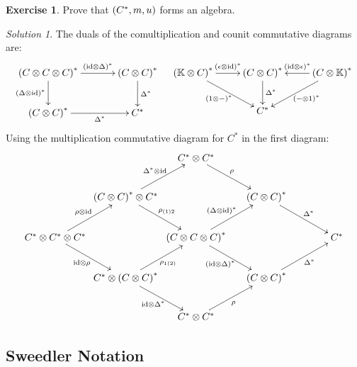 \documentclass[svgnames]{article}
\theoremstyle{definition}
\newtheorem{Exercise}{Exercise}
\theoremstyle{remark}
\newtheorem*{Solution*}{Solution}
\theoremstyle{underline}
\theoremstyle{underline}
\newcommand{\id}{\mathrm{id}}
\begin{document}
 	\begin{Exercise}
 		Prove that $\pqty{C^*, m, u}$ forms an algebra.
 	\end{Exercise}
 	\begin{Solution*}
 		The duals of the comultiplication and counit commutative diagrams are:
 		\begin{align*}
		\xymatrix@!C{
			\pqty{C \otimes C \otimes C}^* \ar[r]^-{\pqty{\id \otimes \Delta}^*} \ar[d]_{\pqty{\Delta \otimes \id}^*} & \pqty{C \otimes C}^*   \ar[d]^-{\Delta^*} \\
			\pqty{C \otimes C}^* \ar[r]_-{\Delta^*} & C^*
		} & &
		\xymatrix@!C{
			\pqty{\mathbb K \otimes C}^* \ar[r]^-{\pqty{\epsilon \otimes \id}^*} \ar[rd]_{\pqty{1 \otimes -}^*} & \pqty{C \otimes C}^* \ar[d]^{\Delta^*} & \pqty{C \otimes \mathbb K}^* \ar[l]_-{\pqty{\id \otimes \epsilon}^*} \ar[ld]^{\pqty{-\otimes 1}^*} \\
			& C^* &	
		}
		\end{align*}
		Using the multiplication commutative diagram for $C^*$ in the first diagram:
		\begin{align*}
		\xymatrix@!C @C-2pc{
			& & C^* \otimes C^* \ar[rd]^-{\rho} & &  \\
			& \pqty{C \otimes C}^* \otimes C^* \ar[rd]^-{\rho_{(1)2}} \ar[ru]^-{\Delta^* \otimes \id} & & \pqty{C \otimes C}^* \ar[rd]^-{\Delta^*} & \\
			{C^* \otimes C^* \otimes C^*} \ar[ru]^-{\rho \otimes \id} \ar[rd]_-{\id \otimes \rho} & & \pqty{C \otimes C \otimes C}^* \ar[ru]^-{\pqty{\Delta \otimes \id}^*} \ar[rd]_-{\pqty{\id \otimes \Delta}^*} & & C^*\\
			& C^* \otimes \pqty{C \otimes C}^* \ar[ru]_-{\rho_{1(2)}} \ar[rd]_-{\id \otimes \Delta^*} & & \pqty{C \otimes C}^* \ar[ru]_-{\Delta^*} & \\  
			& & C^* \otimes C^* \ar[ru]_-{\rho} & & 
			}
		\end{align*}
 	\end{Solution*}
	
	\subsection{Sweedler Notation}
\end{document}
